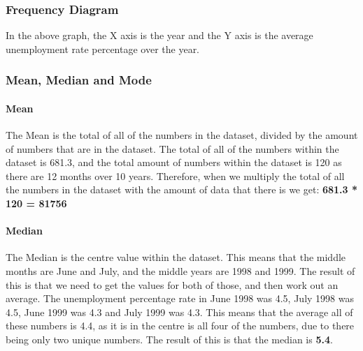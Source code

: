 \documentclass[a4paper,12pt]{article}
\begin{document}
  \newpage

  \subsubsection{Frequency Diagram}

  In the above graph, the X axis is the year and the Y axis is the average unemployment rate percentage over the year.

  \subsubsection{Mean, Median and Mode}
    \paragraph{Mean}
      The Mean is the total of all of the numbers in the dataset, divided by the amount of numbers that are in the dataset. The total of all of the numbers within the dataset is 681.3, and the total amount of numbers within the dataset is 120 as there are 12 months over 10 years. Therefore, when we multiply the total of all the numbers in the dataset with the amount of data that there is we get:
      \textbf{681.3 * 120 = 81756}

      \paragraph{Median}
        The Median is the centre value within the dataset. This means that the middle months are June and July, and the middle years are 1998 and 1999. The result of this is that we need to get the values for both of those, and then work out an average. The unemployment percentage rate in June 1998 was 4.5, July 1998 was 4.5, June 1999 was 4.3 and July 1999 was 4.3. This means that the average all of these numbers is 4.4, as it is in the centre is all four of the numbers, due to there being only two unique numbers. The result of this is that the median is \textbf{5.4}.
\end{document}
